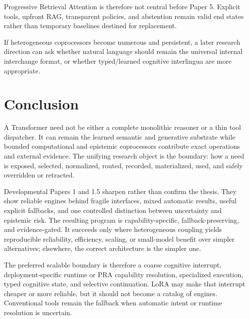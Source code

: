 \documentclass[11pt]{article}
\begin{document}
Progressive Retrieval Attention is therefore not central before Paper 5.
Explicit tools, upfront RAG, transparent policies, and abstention remain valid
end states rather than temporary baselines destined for replacement.

If heterogeneous coprocessors become numerous and persistent, a later research
direction can ask whether natural language should remain the universal internal
interchange format, or whether typed/\allowbreak learned cognitive interlingua are more
appropriate.

\section{Conclusion}

A Transformer need not be either a complete monolithic reasoner or a thin tool
dispatcher.  It can remain the learned semantic and generative substrate while
bounded computational and epistemic coprocessors contribute exact operations
and external evidence.  The unifying research object is the boundary: how a
need is exposed, selected, normalized, routed, recorded, materialized, used,
and safely overridden or retracted.

Developmental Papers 1 and 1.5 sharpen rather than confirm the thesis.  They
show reliable engines behind fragile interfaces, mixed automatic results,
useful explicit fallbacks, and one controlled distinction between uncertainty
and epistemic risk.  The resulting program is capability-specific,
fallback-preserving, and evidence-gated.  It succeeds only where heterogeneous
coupling yields reproducible reliability, efficiency, scaling, or small-model
benefit over simpler alternatives; elsewhere, the correct architecture is the
simpler one.

The preferred scalable boundary is therefore a coarse cognitive interrupt,
deployment-specific runtime or PRA capability resolution, specialized
execution, typed cognitive state, and selective continuation. LoRA may make
that interrupt cheaper or more reliable, but it should not become a catalog of
engines. Conventional tools remain the fallback when automatic intent or
runtime resolution is uncertain.
\end{document}
